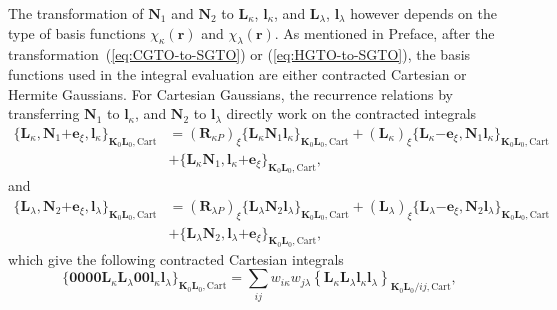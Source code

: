 \documentclass[a4paper,11pt,twoside,openright]{book}
\begin{document}
The transformation of $\boldsymbol{N}_{1}$ and $\boldsymbol{N}_{2}$ to
$\boldsymbol{L}_{\kappa}$, $\boldsymbol{l}_{\kappa}$, and $\boldsymbol{L}_{\lambda}$,
$\boldsymbol{l}_{\lambda}$ however depends on the type of basis functions
$\chi_{\kappa}(\boldsymbol{r})$ and $\chi_{\lambda}(\boldsymbol{r})$. As mentioned
in Preface, after the transformation~(\ref{eq:CGTO-to-SGTO}) or (\ref{eq:HGTO-to-SGTO}),
the basis functions used in the integral evaluation are either contracted Cartesian or
Hermite Gaussians. For Cartesian Gaussians, the recurrence relations by transferring
$\boldsymbol{N}_{1}$ to $\boldsymbol{l}_{\kappa}$, and $\boldsymbol{N}_{2}$ to
$\boldsymbol{l}_{\lambda}$ directly work on the contracted integrals~\cite{bgkrth-a}
\begin{align}
  \label{eq:recurrence-phase-cart-bra}
  \{\boldsymbol{L}_{\kappa},\boldsymbol{N}_{1}\mathrm{+}\boldsymbol{e}_{\xi},%
    \boldsymbol{l}_{\kappa}\}_{\boldsymbol{K}_{0}\boldsymbol{L}_{0},\text{Cart}}
  &=(\boldsymbol{R}_{\kappa P})_{\xi}\{\boldsymbol{L}_{\kappa}\boldsymbol{N}_{1}%
    \boldsymbol{l}_{\kappa}\}_{\boldsymbol{K}_{0}\boldsymbol{L}_{0},\text{Cart}}%
  +(\boldsymbol{L}_{\kappa})_{\xi}\{\boldsymbol{L}_{\kappa}\mathrm{-}\boldsymbol{e}_{\xi},\boldsymbol{N}_{1}%
    \boldsymbol{l}_{\kappa}\}_{\boldsymbol{K}_{0}\boldsymbol{L}_{0},\text{Cart}}\nonumber\\
  &+\{\boldsymbol{L}_{\kappa}\boldsymbol{N}_{1},%
    \boldsymbol{l}_{\kappa}\mathrm{+}\boldsymbol{e}_{\xi}\}_{\boldsymbol{K}_{0}\boldsymbol{L}_{0},\text{Cart}},
\end{align}
and
\begin{align}
  \label{eq:recurrence-phase-cart-ket}
  \{\boldsymbol{L}_{\lambda},\boldsymbol{N}_{2}\mathrm{+}\boldsymbol{e}_{\xi},%
    \boldsymbol{l}_{\lambda}\}_{\boldsymbol{K}_{0}\boldsymbol{L}_{0},\text{Cart}}
  &=(\boldsymbol{R}_{\lambda P})_{\xi}\{\boldsymbol{L}_{\lambda}\boldsymbol{N}_{2}%
    \boldsymbol{l}_{\lambda}\}_{\boldsymbol{K}_{0}\boldsymbol{L}_{0},\text{Cart}}%
  +(\boldsymbol{L}_{\lambda})_{\xi}\{\boldsymbol{L}_{\lambda}\mathrm{-}\boldsymbol{e}_{\xi},\boldsymbol{N}_{2}%
    \boldsymbol{l}_{\lambda}\}_{\boldsymbol{K}_{0}\boldsymbol{L}_{0},\text{Cart}}\nonumber\\
  &+\{\boldsymbol{L}_{\lambda}\boldsymbol{N}_{2},%
    \boldsymbol{l}_{\lambda}\mathrm{+}\boldsymbol{e}_{\xi}\}_{\boldsymbol{K}_{0}\boldsymbol{L}_{0},\text{Cart}},
\end{align}
which give the following contracted Cartesian integrals
\begin{equation}
  \label{eq:nonlao-aux-int-cart}
  \{\boldsymbol{0000}%
    \boldsymbol{L}_{\kappa}\boldsymbol{L}_{\lambda}\boldsymbol{00}%
    \boldsymbol{l}_{\kappa}\boldsymbol{l}_{\lambda}\}_{\boldsymbol{K}_{0}\boldsymbol{L}_{0},\text{Cart}}
  =\sum_{ij}w_{i\kappa}w_{j\lambda}\left\{\boldsymbol{L}_{\kappa}\boldsymbol{L}_{\lambda}%
    \boldsymbol{l}_{\kappa}\boldsymbol{l}_{\lambda}\right\}_{\boldsymbol{K}_{0}\boldsymbol{L}_{0}/ij,\text{Cart}},
\end{equation}
\end{document}
